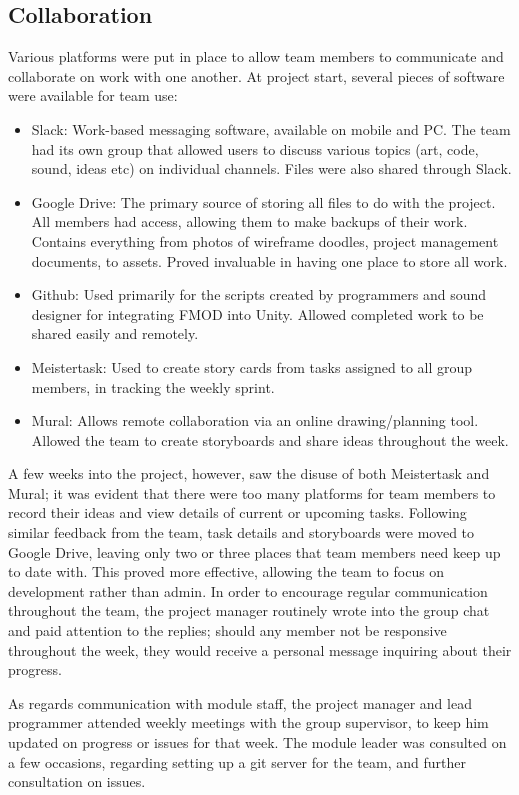 \documentclass[12pt]{article}
\begin{document}
\subsection{Collaboration}
Various platforms were put in place to allow team members to communicate and collaborate on work with one another. At project start, several pieces of software were available for team use: 
\begin{itemize}
	\item Slack: Work-based messaging software, available on mobile and PC. The team had its own group that allowed users to discuss various topics (art, code, sound, ideas etc) on individual channels. Files were also shared through Slack.  
	\item Google Drive: The primary source of storing all files to do with the project. All members had access, allowing them to make backups of their work. Contains everything from photos of wireframe doodles, project management documents, to assets. Proved invaluable in having one place to store all work.
	\item Github: Used primarily for the scripts created by programmers and sound designer for integrating FMOD into Unity. Allowed completed work to be shared easily and remotely. 
	\item Meistertask: Used to create story cards from tasks assigned to all group members, in tracking the weekly sprint.  
	\item Mural: Allows remote collaboration via an online drawing/planning tool. Allowed the team to create storyboards and share ideas throughout the week. 
\end{itemize}

A few weeks into the project, however, saw the disuse of both Meistertask and Mural; it was evident that there were too many platforms for team members to record their ideas and view details of current or upcoming tasks. Following similar feedback from the team, task details and storyboards were moved to Google Drive, leaving only two or three places that team members need keep up to date with. This proved more effective, allowing the team to focus on development rather than admin. In order to encourage regular communication throughout the team, the project manager routinely wrote into the group chat and paid attention to the replies; should any member not be responsive throughout the week, they would receive a personal message inquiring about their progress. 

As regards communication with module staff, the project manager and lead programmer attended weekly meetings with the group supervisor, to keep him updated on progress or issues for that week. The module leader was consulted on a few occasions, regarding setting up a git server for the team, and further consultation on issues. 
\end{document}
